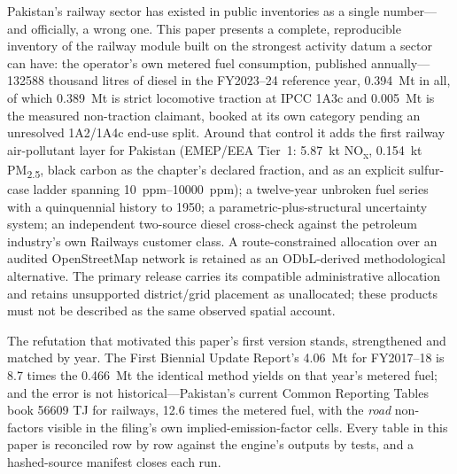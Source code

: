Pakistan's railway sector has existed in public inventories as a single number---and
officially, a wrong one. This paper presents a complete, reproducible inventory of the
railway module built on the strongest activity datum a sector can have: the operator's own
metered fuel consumption, published annually---\num{132588} thousand litres of diesel in
the FY2023--24 reference year, \SI{0.394}{\mega\tonne} \COe{} in all, of which
\SI{0.389}{\mega\tonne} is strict locomotive traction at IPCC 1A3c and
\SI{0.005}{\mega\tonne} is the measured non-traction claimant, booked at its own
category pending an unresolved 1A2/1A4c end-use split. Around that control it adds
the first railway air-pollutant layer for Pakistan (EMEP/EEA Tier~1:
\SI{5.87}{\kilo\tonne} NO\textsubscript{x}, \SI{0.154}{\kilo\tonne} PM\textsubscript{2.5},
black carbon as the chapter's declared fraction, and \SOtwo{} as an explicit sulfur-case
ladder spanning \SIrange{10}{10000}{ppm}); a twelve-year unbroken fuel series with a
quinquennial history to 1950; a parametric-plus-structural uncertainty system; an
independent two-source diesel cross-check against the petroleum industry's own Railways
customer class. A route-constrained allocation over an audited OpenStreetMap network is retained as an ODbL-derived methodological alternative. The primary release carries its compatible administrative allocation and retains unsupported district/grid placement as unallocated; these products must not be described as the same observed spatial account.

The refutation that motivated this paper's first version stands, strengthened and matched
by year. The First Biennial Update Report's \SI{4.06}{\mega\tonne} for FY2017--18 is
\num{8.7} times the \SI{0.466}{\mega\tonne} the identical method yields on that year's
metered fuel; and the error is not historical---Pakistan's current Common Reporting Tables
book \num{56609} TJ for railways, \num{12.6} times the metered fuel, with the \emph{road}
non-\COtwo{} factors visible in the filing's own implied-emission-factor cells. Every
table in this paper is reconciled row by row against the engine's outputs by tests, and a
hashed-source manifest closes each run.
